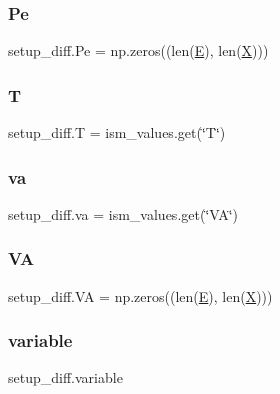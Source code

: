 \subsubsection{\texorpdfstring{Pe}{Pe}}
{\footnotesize\ttfamily setup\+\_\+diff.\+Pe = np.\+zeros((len(\hyperlink{namespacesetup__diff_aa5cb1501a25fe4b39a92f30f468e71e8}{E}), len(\hyperlink{namespacesetup__diff_ad01f7c1ee607d8a67926e30be25385f1}{X})))}

\mbox{\label{namespacesetup__diff_a5476c880f474eb8d08fe960274345405}} 
\subsubsection{\texorpdfstring{T}{T}}
{\footnotesize\ttfamily setup\+\_\+diff.\+T = ism\+\_\+values.\+get(\char`\"{}T\char`\"{})}

\mbox{\label{namespacesetup__diff_a1610855b83176234c98cf57eb49e474b}} 
\subsubsection{\texorpdfstring{va}{va}}
{\footnotesize\ttfamily setup\+\_\+diff.\+va = ism\+\_\+values.\+get(\char`\"{}VA\char`\"{})}

\mbox{\label{namespacesetup__diff_a8681801c5226772c455e3a38f31290d9}} 
\subsubsection{\texorpdfstring{VA}{VA}}
{\footnotesize\ttfamily setup\+\_\+diff.\+VA = np.\+zeros((len(\hyperlink{namespacesetup__diff_aa5cb1501a25fe4b39a92f30f468e71e8}{E}), len(\hyperlink{namespacesetup__diff_ad01f7c1ee607d8a67926e30be25385f1}{X})))}

\mbox{\label{namespacesetup__diff_ae00dc4334653d7a88a9ed6cb21e05d8d}} 
\subsubsection{\texorpdfstring{variable}{variable}}
{\footnotesize\ttfamily setup\+\_\+diff.\+variable}


